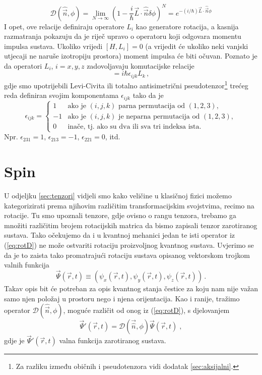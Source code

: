 \begin{equation}
\mathcal{D}(\hat{\vec{n}}, \phi)=\lim_{N\to\infty}
\left(1-\frac{i}{\hbar}\vec{L}\cdot\hat{\vec{n}}\delta\phi \right)^N
= e^{-(i/\hbar)\vec{L}\cdot\hat{\vec{n}}\phi}
\label{eq:rotD}
\end{equation}
I opet, ove relacije definiraju operatore $L_i$ kao generatore rotacija,
a kasnija razmatranja pokazuju da je riječ upravo o operatoru koji
odgovara momentu impulsa sustava.
Ukoliko vrijedi $[H,L_{i}]=0$ (a vrijedit će ukoliko neki vanjski utjecaji
ne naruše izotropiju prostora) moment impulsa će biti očuvan.
Poznato je da operatori $L_i$, $i=x,y,z$ zadovoljavaju komutacijske relacije
\begin{equation}
    [L_i, L_j] = i\hbar \epsilon_{ijk}  L_k \,,
    \label{eq:Lkomutacija}
\end{equation}
gdje smo upotrijebili Levi-Civita ili totalno antisimetrični pseudotenzor\footnote{Za
razliku između običnih i pseudotenzora vidi dodatak \ref{sec:aksijalni}.}
trećeg reda definiran
svojim komponentama $\epsilon_{ijk}$ tako da je
\begin{displaymath}
\epsilon_{ijk}=
\begin{cases}
1& \text{ako je $(i,j,k)$ parna permutacija od $(1,2,3)$}, \\
-1& \text{ako je $(i,j,k)$ je neparna permutacija od $(1,2,3)$}, \\
0& \text{inače, tj. ako su dva ili sva tri indeksa ista}.
\end{cases} 
\end{displaymath}
Npr. $\epsilon_{231}=1$, $\epsilon_{213}=-1$, $\epsilon_{221}=0$, itd.

\section{Spin}

U odjeljku \ref{sec:tenzori} vidjeli smo kako veličine u klasičnoj fizici
možemo kategorizirati prema njihovim različitim transformacijskim svojstvima,
recimo na rotacije. Tu smo upoznali tenzore, gdje ovisno o rangu tenzora,
trebamo ga množiti različitim brojem rotacijskih matrica da bismo zapisali
tenzor zarotiranog sustava. Tako očekujemo da i u kvantnoj mehanici jedan
te isti operator
iz (\ref{eq:rotD}) ne može ostvariti
rotaciju proizvoljnog kvantnog sustava.
Uvjerimo se da je to zaista tako
promatrajući rotaciju sustava opisanog vektorskom trojkom valnih funkcija
\begin{equation}
  \vec{\Psi}(\vec{r},t) \equiv (\psi_{x}(\vec{r}, t),
 \psi_{y}(\vec{r}, t), \psi_{z}(\vec{r}, t)) \,.
 \label{eq:psitrojka}
\end{equation}
Takav opis bit će potreban za opis kvantnog stanja čestice za koju nam nije
važan samo njen položaj u prostoru nego i njena orijentacija.
Kao i ranije, tražimo operator $\mathcal{D}(\hat{\vec{n}}, \phi)$, moguće
različit od onog iz (\ref{eq:rotD}), s djelovanjem
\begin{equation}
  \vec{\Psi}'(\vec{r},t) = \mathcal{D}
(\vec{\hat{n}},\phi) \vec{\Psi}(\vec{r},t) \;,
\end{equation}
gdje je $\vec{\Psi}'(\vec{r},t)$ valna funkcija zarotiranog sustava.

